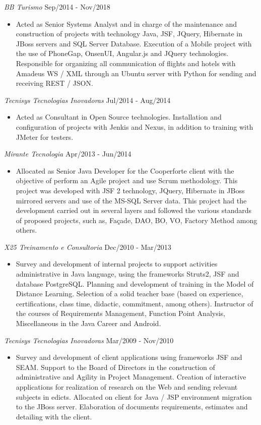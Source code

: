 \documentclass{res}
\begin{document}
\begin{resume}
		{\sl BB Turismo} \hfill Sep/2014 - Nov/2018
		\begin{itemize}
			\item Acted as Senior Systems Analyst and in charge of the maintenance and construction of projects with technology Java, JSF, JQuery, Hibernate in JBoss servers and SQL Server Database. Execution of a Mobile project with the use of PhoneGap, OnsenUI, Angular.js and JQuery technologies. Responsible for organizing all communication of flights and hotels with Amadeus WS / XML through an Ubuntu server with Python for sending and receiving REST / JSON.
		\end{itemize}
		
		{\sl Tecnisys Tecnologias Inovadoras} \hfill Jul/2014 - Aug/2014
		\begin{itemize}
			\item Acted as Consultant in Open Source technologies. Installation and configuration of projects with Jenkis and Nexus, in addition to training with JMeter for testers.
		\end{itemize}
		
		{\sl Mirante Tecnologia} \hfill Apr/2013 - Jun/2014
		\begin{itemize}
			\item Allocated as Senior Java Developer for the Cooperforte client with the objective of perform an Agile project and use Scrum methodology. This project was developed with JSF 2 technology, JQuery, Hibernate in JBoss mirrored servers and use of the MS-SQL Server data. This project had the development carried out in several layers and followed the various standards of proposed projects, such as, Façade, DAO, BO, VO, Factory Method among others.
		\end{itemize}
		
		{\sl X25 Treinamento e Consultoria} \hfill Dec/2010 - Mar/2013
		\begin{itemize}
			\item Survey and development of internal projects to support activities administrative in Java language, using the frameworks Struts2, JSF and database PostgreSQL. Planning and development of training in the Model of Distance Learning. Selection of a solid teacher base (based on experience, certifications, class time, didactic, commitment, among others). Instructor of the courses of Requirements Management, Function Point Analysis, Miscellaneous in the Java Career
			and Android.
		\end{itemize}
		
		{\sl Tecnisys Tecnologias Inovadoras} \hfill Mar/2009 - Nov/2010
		\begin{itemize}
			\item Survey and development of client applications using frameworks JSF and SEAM. Support to the Board of Directors in the construction of administrative and Agility in Project Management. Creation of interactive applications for realization of research on the Web and sending relevant subjects in edicts. Allocated on client for Java / JSP environment migration to the JBoss server. Elaboration of documents requirements, estimates and detailing with the client.
		\end{itemize}
		

\end{resume}
\end{document}
